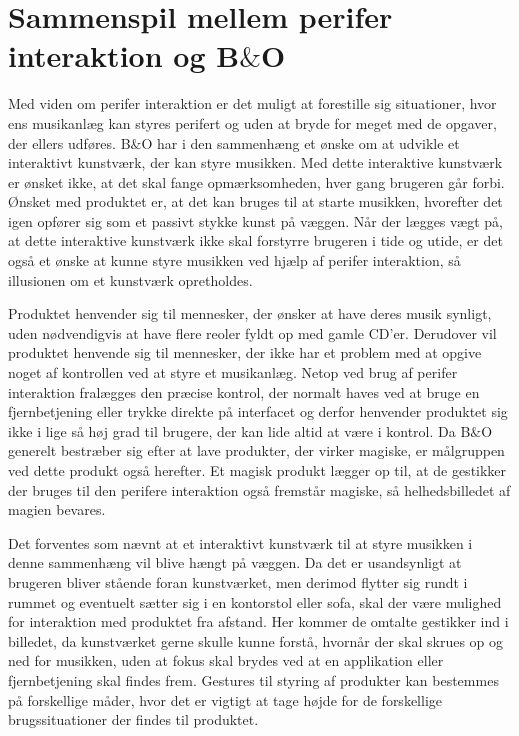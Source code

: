 \section{Sammenspil mellem perifer interaktion og B$\&$O}
\label{Sammenspil mellem perifer interaktion og BO}

Med viden om perifer interaktion er det muligt at forestille sig situationer, hvor ens musikanlæg kan styres perifert og uden at bryde for meget med de opgaver, der ellers udføres. B$\&$O har i den sammenhæng et ønske om at udvikle et interaktivt kunstværk, der kan styre musikken. Med dette interaktive kunstværk er ønsket ikke, at det skal fange opmærksomheden, hver gang brugeren går forbi. Ønsket med produktet er, at det kan bruges til at starte musikken, hvorefter det igen opfører sig som et passivt stykke kunst på væggen. Når der lægges vægt på, at dette interaktive kunstværk ikke skal forstyrre brugeren i tide og utide, er det også et ønske at kunne styre musikken ved hjælp af perifer interaktion, så illusionen om et kunstværk opretholdes. 

Produktet henvender sig til mennesker, der ønsker at have deres musik synligt, uden nødvendigvis at have flere reoler fyldt op med gamle CD'er. Derudover vil produktet henvende sig til mennesker, der ikke har et problem med at opgive noget af kontrollen ved at styre et musikanlæg. Netop ved brug af perifer interaktion fralægges den præcise kontrol, der normalt haves ved at bruge en fjernbetjening eller trykke direkte på interfacet og derfor henvender produktet sig ikke i lige så høj grad til brugere, der kan lide altid at være i kontrol. Da B$\&$O generelt bestræber sig efter at lave produkter, der virker magiske, er målgruppen ved dette produkt også herefter. Et magisk produkt lægger op til, at de gestikker der bruges til den perifere interaktion også fremstår magiske, så helhedsbilledet af magien bevares. 

Det forventes som nævnt at et interaktivt kunstværk til at styre musikken i denne sammenhæng vil blive hængt på væggen. Da det er usandsynligt at brugeren bliver stående foran kunstværket, men derimod flytter sig rundt i rummet og eventuelt sætter sig i en kontorstol eller sofa, skal der være mulighed for interaktion med produktet fra afstand. Her kommer de omtalte gestikker ind i billedet, da kunstværket gerne skulle kunne forstå, hvornår der skal skrues op og ned for musikken, uden at fokus skal brydes ved at en applikation eller fjernbetjening skal findes frem. Gestures til styring af produkter kan bestemmes på forskellige måder, hvor det er vigtigt at tage højde for de forskellige brugssituationer der findes til produktet.  

